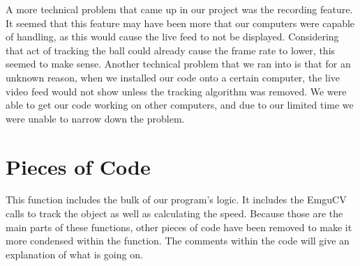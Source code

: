 \documentclass[onecolumn, draftclsnofoot,10pt, compsoc]{IEEEtran}
\begin{document}
A more technical problem that came up in our project was the recording feature.
It seemed that this feature may have been more that our computers were capable of handling, as this would cause the live feed to not be displayed.
Considering that act of tracking the ball could already cause the frame rate to lower, this seemed to make sense.
Another technical problem that we ran into is that for an unknown reason, when we installed our code onto a certain computer, the live video feed would not show unless the tracking algorithm was removed.
We were able to get our code working on other computers, and due to our limited time we were unable to narrow down the problem.


\section{Pieces of Code}
This function includes the bulk of our program's logic. It includes the EmguCV calls to track the object as well as calculating the speed. Because those are the main parts of these functions, other pieces of code have been removed to make it more condensed within the function.
The comments within the code will give an explanation of what is going on.
\end{document}
